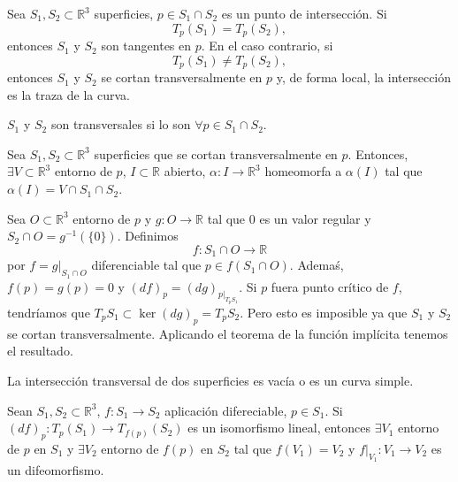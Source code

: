 \begin{note}

\end{note}

\begin{defn}
  Sea $S_{1}, S_{2} \subset \mathbb{R}^{3}$ superficies, $p \in S_{1} \cap S_{2}$ es un punto de intersección. Si
  \[
    T_{p}(S_{1}) = T_{p}(S_{2}),
  \]
  entonces $S_{1}$ y $S_{2}$ son tangentes en $p$. En el caso contrario, si 
  \[
    T_{p}(S_{1}) \neq T_{p}(S_{2}),
  \]
  entonces $S_{1}$ y $S_{2}$ se cortan transversalmente en $p$ y, de forma local, la intersección es la traza de la curva.
\end{defn}

\begin{obs}
  $S_{1}$ y $S_{2}$ son transversales si lo son $\forall p \in S_{1} \cap S_{2}$.
\end{obs}

\begin{prop}
  Sea $S_{1}, S_{2} \subset \mathbb{R}^{3}$ superficies que se cortan transversalmente en $p$. Entonces, $\exists V \subset \mathbb{R}^{3}$ entorno de $p$, $I \subset \mathbb{R}$ abierto, $\alpha : I \to \mathbb{R}^{3}$ homeomorfa a $\alpha(I)$ tal que $\alpha(I) = V \cap S_{1} \cap S_{2}$.
\end{prop}

\begin{dem}
  Sea $O \subset \mathbb{R}^{3}$ entorno de $p$ y $g : O \to \mathbb{R}$ tal que $0$ es un valor regular y $S_{2} \cap O = g^{-1}(\{ 0 \})$. Definimos
  \[
    f :  S_{1} \cap O \to \mathbb{R}
  \]
  por $f = g|_{S_{1} \cap O}$ diferenciable tal que $p \in f(S_{1} \cap O)$. Ademaś, $f(p) = g(p) = 0$ y $(d f)_{p} = (d g)_{p|_{T_{p}S_{1}}}$. Si $ p$ fuera punto crítico de $f$, tendríamos que $T_{p}S_{1} \subset \ker(dg)_{p} = T_{p}S_{2}$. Pero esto es imposible ya que $S_{1}$ y $S_{2}$ se cortan transversalmente. Aplicando el teorema de la función implícita tenemos el resultado.
\end{dem}

\begin{theo}
  La intersección transversal de dos superficies es vacía o es un curva simple.
\end{theo}

\begin{theo}
  Sean $S_{1}, S_{2} \subset \mathbb{R}^{3}$, $f : S_{1} \to S_{2}$ aplicación difereciable, $p \in S_{1}$. Si $(d f)_{p} : T_{p}(S_{1}) \to T_{f(p)}(S_{2})$ es un isomorfismo lineal, entonces $\exists V_{1}$ entorno de $ p $ en $S_{1}$ y $\exists V_{2}$ entorno de $f(p)$ en $S_{2}$ tal que $f(V_{1}) = V_{2}$ y $f|_{V_{1}} : V_{1} \to V_{2}$ es un difeomorfismo.
\end{theo}

